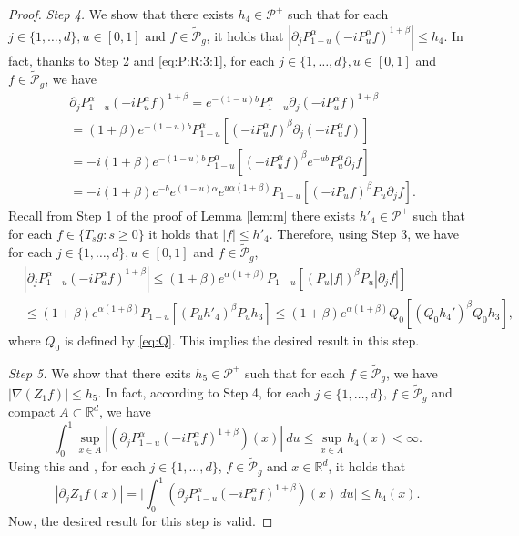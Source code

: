 \documentclass[12pt,a4paper]{amsart}
\theoremstyle{plain}
\theoremstyle{definition}
\numberwithin{equation}{section}
\begin{document}
\begin{proof}
  \emph{Step 4.} We show that there exists $h_{4} \in \mathcal P^+$ such that for each $j \in \{1,\dots, d\}, u \in [0, 1]$ and $f \in \widetilde {\mathcal P}_g$, it holds that $ | \partial_j  P_{1-u}^\alpha (- i P_u^\alpha f)^{1+\beta} | \leq h_4$.
  In fact, thanks to Step 2 and \eqref{eq:P:R:3:1}, for each $j \in \{1,\dots, d\}, u \in [0, 1]$ and $f \in \widetilde{\mathcal P}_g$, we have
  \begin{align}
    & \partial_j  P_{1-u}^\alpha (- i P_u^\alpha f)^{1+\beta}
      = e^{-(1-u)b} P_{1-u}^\alpha \partial_j (- i P_u^\alpha f)^{1+\beta}
    \\ & = (1+\beta) e^{-(1-u)b} P_{1-u}^\alpha [ (- i P_u^\alpha f)^\beta \partial_j (- i P_u^\alpha f) ]
    \\ & = -i(1+\beta) e^{-(1-u)b} P_{1-u}^\alpha[ (- i P_u^\alpha f)^\beta e^{-ub} P_u^\alpha \partial_j f]
    \\ & = -i(1+\beta) e^{-b} e^{(1-u)\alpha} e^{u\alpha (1+\beta)} P_{1-u} [ (- i P_u f)^\beta P_u \partial_j f ].
  \end{align}
  Recall from Step 1 of the proof of Lemma \ref{lem:m} there exists $h'_4\in \mathcal P^+$ such that for each $f \in \{T_sg:s\geq 0\}$ it holds that $|f| \leq h'_4$.
  Therefore, using Step 3, we have for each $j \in \{1,\dots, d\}, u \in [0, 1]$ and $f \in \widetilde {\mathcal P}_g$,
  \begin{align}
    & |\partial_j  P_{1-u}^\alpha (- i P_u^\alpha f)^{1+\beta}|
    \leq (1+\beta) e^{\alpha (1+\beta)} P_{1-u} [  (P_u |f|)^\beta P_u |\partial_j f| ]
    \\ & \leq (1+\beta) e^{\alpha (1+\beta)} P_{1-u} [  (P_u h'_4)^\beta P_u h_3 ]
    \leq (1+\beta) e^{\alpha (1+\beta)} Q_0 [  (Q_0 h_4')^\beta Q_0 h_3 ],
  \end{align}
  where $Q_0$ is defined by \eqref{eq:Q}.
  This implies the desired result in this step.
  
  \emph{Step 5.} We show that there exits $h_5 \in \mathcal P^+$ such that for each $f \in \widetilde {\mathcal P}_g$, we have $ |\nabla (Z_1f)| \leq h_5$.
  In fact, according to Step 4, for each $j \in \{1,\dots, d\}$, $f \in \widetilde{\mathcal P}_g$ and compact $A \subset \mathbb R^d$, we have
  \[
    \int_0^1 \sup_{x\in A} | (\partial_j  P_{1-u}^\alpha (-i P_u^\alpha f)^{1+\beta}) (x) |~du
    \leq \sup_{x\in A} h_4(x) < \infty.
  \]
  Using this and \cite[Theorem A.5.2]{Durrett2010Probability}, for each $j \in \{1,\dots, d\}$, $f\in \widetilde {\mathcal P}_g$ and $x\in \mathbb R^d$, it holds that
  \[
    | \partial_j Z_1 f(x)|
    = \Big| \int_0^1  ( \partial_jP_{1-u}^\alpha (-iP_u^\alpha f)^{1+\beta} ) (x) ~du  \Big|
    \leq h_4(x).
  \]
  Now, the desired result for this step is valid.


\end{proof}
\end{document}

